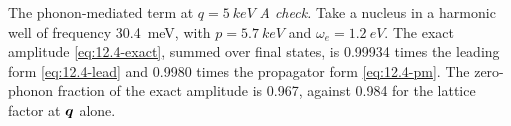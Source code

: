 \begin{workedexample}{The phonon-mediated term at $q = \SI{5}{keV}$}
\emph{A check.} Take a nucleus in a harmonic well of frequency \SI{30.4}{meV}, with $p = \SI{5.7}{keV}$ and $\omega_e = \SI{1.2}{eV}$. The exact amplitude \cref{eq:12.4-exact}, summed over final states, is 0.99934 times the leading form \cref{eq:12.4-lead} and 0.9980 times the propagator form \cref{eq:12.4-pm}. The zero-phonon fraction of the exact amplitude is 0.967, against 0.984 for the lattice factor at $\bm{q}$ alone.
\end{workedexample}
